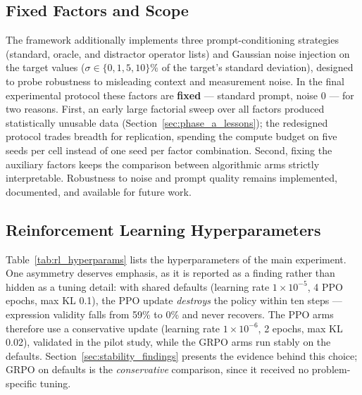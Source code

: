 \subsection{Fixed Factors and Scope}
\label{sec:fixed_factors}

The framework additionally implements three prompt-conditioning strategies (standard, oracle, and distractor operator lists) and Gaussian noise injection on the target values ($\sigma \in \{0, 1, 5, 10\}\%$ of the target's standard deviation), designed to probe robustness to misleading context and measurement noise. In the final experimental protocol these factors are \textbf{fixed} --- standard prompt, noise 0 --- for two reasons. First, an early large factorial sweep over all factors produced statistically unusable data (Section~\ref{sec:phase_a_lessons}); the redesigned protocol trades breadth for replication, spending the compute budget on five seeds per cell instead of one seed per factor combination. Second, fixing the auxiliary factors keeps the comparison between algorithmic arms strictly interpretable. Robustness to noise and prompt quality remains implemented, documented, and available for future work.

\subsection{Reinforcement Learning Hyperparameters}
\label{sec:rl_hyperparams}

Table~\ref{tab:rl_hyperparams} lists the hyperparameters of the main experiment. One asymmetry deserves emphasis, as it is reported as a finding rather than hidden as a tuning detail: with shared defaults (learning rate $1\times10^{-5}$, 4 PPO epochs, max KL 0.1), the PPO update \emph{destroys} the policy within ten steps --- expression validity falls from 59\% to 0\% and never recovers. The PPO arms therefore use a conservative update (learning rate $1\times10^{-6}$, 2 epochs, max KL 0.02), validated in the pilot study, while the GRPO arms run stably on the defaults. Section~\ref{sec:stability_findings} presents the evidence behind this choice; GRPO on defaults is the \emph{conservative} comparison, since it received no problem-specific tuning.

